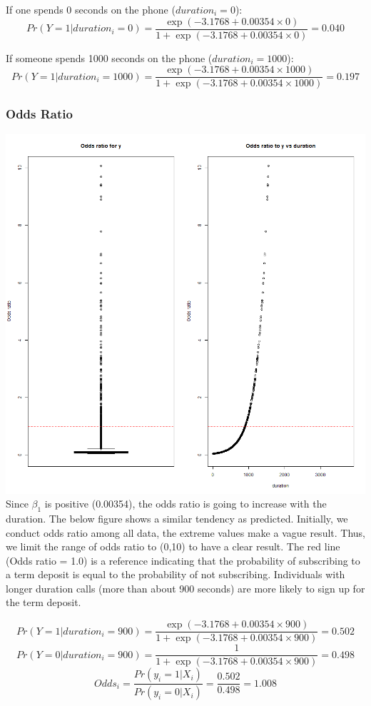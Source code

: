 \documentclass[11pt]{article}
\begin{document}
{If one spends 0 seconds on the phone ($duration_i=0$):
$$Pr(Y=1|duration_i = 0) = \frac{\exp(-3.1768+0.00354 \times 0)}{1+\exp(-3.1768+0.00354 \times 0)} = 0.040$$

If someone spends 1000 seconds on the phone ($duration_i=1000$):
$$Pr(Y=1|duration_i = 1000) = \frac{\exp(-3.1768+0.00354 \times 1000)}{1+\exp(-3.1768+0.00354 \times 1000)} = 0.197$$

\subsubsection*{Odds Ratio}
\includegraphics[scale=0.35]{Odds}\\

Since $\beta_1$ is positive (0.00354), the odds ratio is going to increase with the duration. The below figure shows a similar tendency as predicted. Initially, we conduct odds ratio among all data, the extreme values make a vague result. Thus, we limit the range of odds ratio to (0,10) to have a clear result. The red line (Odds ratio = 1.0) is a reference indicating that the probability of subscribing to a term deposit is equal to the probability of not subscribing. Individuals with longer duration calls (more than about 900 seconds) are more likely to sign up for the term deposit.  

$$Pr(Y=1|duration_i = 900) = \frac{\exp(-3.1768+0.00354 \times 900)}{1+\exp(-3.1768+0.00354 \times 900)} = 0.502$$
$$Pr(Y=0|duration_i = 900) = \frac{1}{1+\exp(-3.1768+0.00354 \times 900)} = 0.498$$
$$Odds_i = \frac{Pr(y_i=1|X_i)}{Pr(y_i=0|X_i)} = \frac{0.502}{0.498} = 1.008$$

}
\end{document}
